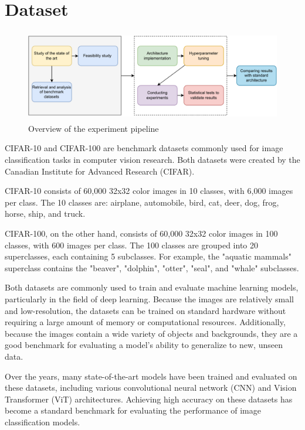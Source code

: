 \section{Dataset}
\label{dataset}
\begin{figure}[!h]
  \includegraphics[width=\textwidth,height=4cm]{images/execution plan.pdf}
  \caption{Overview of the experiment pipeline}
  \label{pipeline}
\end{figure}
CIFAR-10 and CIFAR-100 are benchmark datasets commonly used for image classification tasks in computer vision research. Both datasets were created by the Canadian Institute for Advanced Research (CIFAR).

CIFAR-10 consists of 60,000 32x32 color images in 10 classes, with 6,000 images per class. The 10 classes are: airplane, automobile, bird, cat, deer, dog, frog, horse, ship, and truck.

CIFAR-100, on the other hand, consists of 60,000 32x32 color images in 100 classes, with 600 images per class. The 100 classes are grouped into 20 superclasses, each containing 5 subclasses. For example, the "aquatic mammals" superclass contains the "beaver", "dolphin", "otter", "seal", and "whale" subclasses.

Both datasets are commonly used to train and evaluate machine learning models, particularly in the field of deep learning. Because the images are relatively small and low-resolution, the datasets can be trained on standard hardware without requiring a large amount of memory or computational resources. Additionally, because the images contain a wide variety of objects and backgrounds, they are a good benchmark for evaluating a model's ability to generalize to new, unseen data.

Over the years, many state-of-the-art models have been trained and evaluated on these datasets, including various convolutional neural network (CNN) and Vision Transformer (ViT) architectures. Achieving high accuracy on these datasets has become a standard benchmark for evaluating the performance of image classification models.

